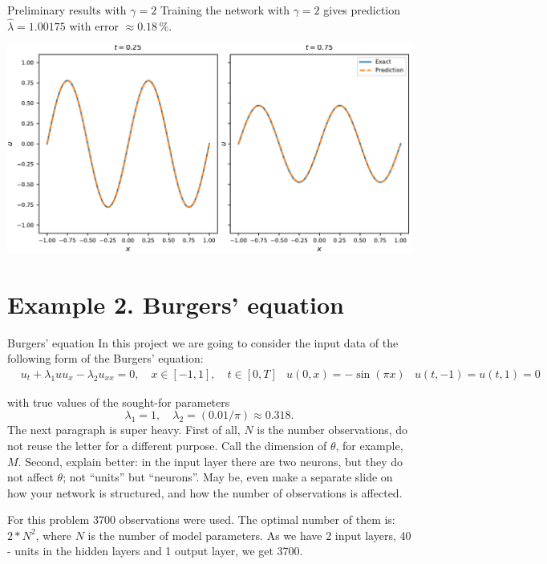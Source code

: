 \documentclass{beamer}
\def\\{}%
\begin{document}
\begin{frame}{Preliminary results with $\gamma=2$}
Training the network with $\gamma=2$ gives prediction $\widehat{\lambda} =
1.00175$ with error $\approx 0.18 \,\%$.

\vspace{0.5cm}
\centering
\includegraphics[scale=0.55]{images/heateq-predictions}

\end{frame}




\section{Example 2. Burgers' equation}

\begin{frame}{Burgers' equation}
In this project we are going to consider the input data of the following form of
the Burgers' equation:
\begin{align*}
&u_t + \lambda_1 u u_x - \lambda_2 u_{xx} = 0, \quad x\in[-1, 1], \quad t\in[0, T]\\
&u(0, x) = -\sin(\pi x) \\
&u(t, -1) = u(t, 1) = 0
\end{align*}

with true values of the sought-for parameters
\[
    \lambda_1 = 1,  \quad \lambda_2 = (0.01 / \pi) \approx 0.318.
\]
{\color{red} The next paragraph is super heavy.
First of all, $N$ is the number observations, do not reuse
the letter for a different purpose.
Call the dimension of $\theta$, for example, $M$.
Second, explain better: in the input layer there are two
neurons, but they do not affect $\theta$; not ``units'' but ``neurons''.
May be, even make a separate slide on how your network
is structured, and how the number of observations is affected.
}

For this problem 3700 observations were used. The optimal number of them is: $2*N^2$, where $N$ is the number of model parameters. As we have 2 input layers, 40 - units in the hidden layers and 1 output layer, we get 3700.


\end{frame}
\end{document}
